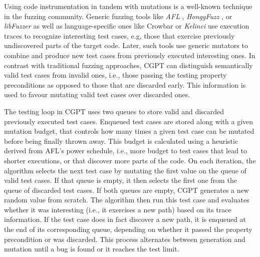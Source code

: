 \documentclass[sigconf, anonymous, review]{acmart}
\begin{document}
Using code instrumentation in tandem with mutations is a well-known technique in
the fuzzing community.
%
Generic fuzzing tools like \emph{AFL} \cite{afl}, \emph{HonggFuzz}
\cite{honggfuzz}, or \emph{libFuzzer} \citeyearpar{libfuzzer} as well as
language-specific ones like Crowbar \cite{dolan2017testing} or \emph{Kelinci}
\cite{kersten2017poster} use execution traces to recognize interesting test
cases, e.g, those that exercise previously undiscovered parts of the target
code.
%
Later, such tools use generic mutators to combine and produce new test cases
from previously executed interesting ones.
%
%
In contrast with traditional fuzzing approaches, CGPT can distinguish
semantically valid test cases from invalid ones, i.e., those passing the testing
property preconditions as opposed to those that are discarded early.
%
This information is used to favour mutating valid test cases over discarded
ones.


The testing loop in CGPT uses two queues to store valid and discarded previously
executed test cases.
%
Enqueued test cases are stored along with a given mutation budget, that controls
how many times a given test case can be mutated before being finally thrown
away.
%
This budget is calculated using a heuristic derived from AFL's power schedule,
i.e., more budget to test cases that lead to shorter executions, or that
discover more parts of the code.
%
On each iteration, the algorithm selects the next test case by mutating the
first value on the queue of valid test cases. If that queue is empty, it then
selects the first one from the queue of discarded test cases.
%
If both queues are empty, CGPT generates a new random value from scratch.
%
The algorithm then run this test case and evaluates whether it was interesting
(i.e., it exercises a new path) based on its trace information.
%
If the test case does in fact discover a new path, it is enqueued at the end of
its corresponding queue, depending on whether it passed the property
precondition or was discarded.
%
%
This process alternates between generation and mutation until a bug is found or
it reaches the test limit.
\end{document}
